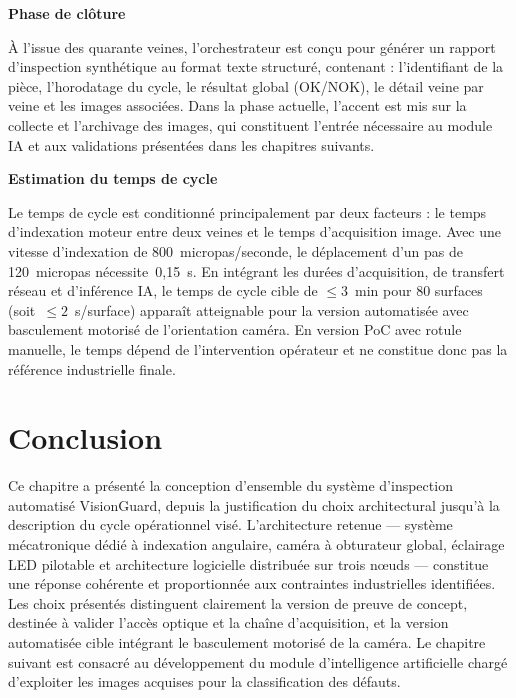 \medskip
\noindent\textbf{Phase de clôture}

À l'issue des quarante veines, l'orchestrateur est conçu pour générer un rapport
d'inspection synthétique au format texte structuré, contenant : l'identifiant de la pièce,
l'horodatage du cycle, le résultat global (OK/NOK), le détail veine par veine et les images
associées. Dans la phase actuelle, l'accent est mis sur la collecte et l'archivage des images,
qui constituent l'entrée nécessaire au module IA et aux validations présentées dans les
chapitres suivants.

\medskip
\noindent\textbf{Estimation du temps de cycle}

Le temps de cycle est conditionné principalement par deux facteurs : le temps d'indexation
moteur entre deux veines et le temps d'acquisition image. Avec une vitesse d'indexation de
800~micropas/seconde, le déplacement d'un pas de 120~micropas nécessite~0,15~s. En intégrant
les durées d'acquisition, de transfert réseau et d'inférence IA, le temps de cycle cible de
$\leq 3$~min pour 80 surfaces (soit~$\leq 2$~s/surface) apparaît atteignable pour la version
automatisée avec basculement motorisé de l'orientation caméra. En version PoC avec rotule
manuelle, le temps dépend de l'intervention opérateur et ne constitue donc pas la référence
industrielle finale.

\section{Conclusion}

Ce chapitre a présenté la conception d'ensemble du système d'inspection automatisé
VisionGuard, depuis la justification du choix architectural jusqu'à la description du cycle
opérationnel visé. L'architecture retenue — système mécatronique dédié à indexation
angulaire, caméra à obturateur global, éclairage LED pilotable et architecture logicielle
distribuée sur trois nœuds — constitue une réponse cohérente et proportionnée aux contraintes
industrielles identifiées. Les choix présentés distinguent clairement la version de preuve de
concept, destinée à valider l'accès optique et la chaîne d'acquisition, et la version
automatisée cible intégrant le basculement motorisé de la caméra. Le chapitre suivant est
consacré au développement du module d'intelligence artificielle chargé d'exploiter les images
acquises pour la classification des défauts.